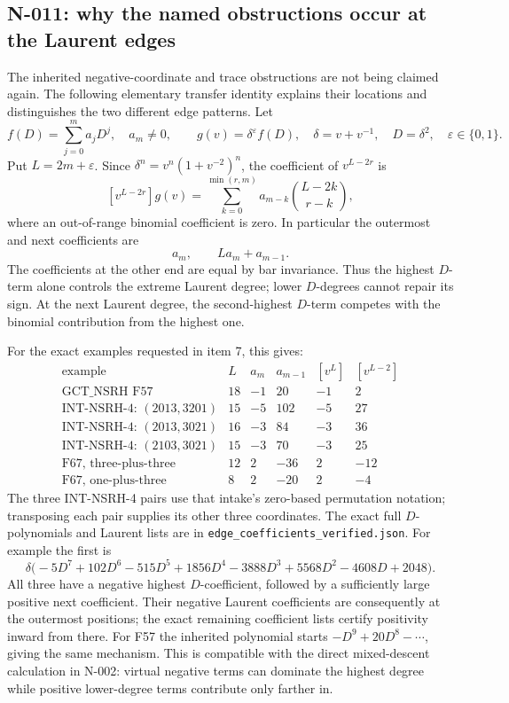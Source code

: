 \subsection{N-011: why the named obstructions occur at the Laurent edges}
\label{sec:nonstandard-edges}

The inherited negative-coordinate and trace obstructions are not being
claimed again.  The following elementary transfer identity explains
their locations and distinguishes the two different edge patterns.
Let
\[
 f(D)=\sum_{j=0}^m a_jD^j,\quad a_m\ne0,\qquad
 g(v)=\delta^\varepsilon f(D),\quad
 \delta=v+v^{-1},\quad D=\delta^2,\quad\varepsilon\in\{0,1\}.
\]
Put $L=2m+\varepsilon$.  Since
$\delta^n=v^n(1+v^{-2})^n$, the coefficient of $v^{L-2r}$ is
\[
 [v^{L-2r}]g(v)=
 \sum_{k=0}^{\min(r,m)}
 a_{m-k}\binom{L-2k}{r-k},
 \tag{N-33}
\]
where an out-of-range binomial coefficient is zero.  In particular
the outermost and next coefficients are
\[
             a_m,\qquad La_m+a_{m-1}.
 \tag{N-34}
\]
The coefficients at the other end are equal by bar invariance.
Thus the highest $D$-term alone controls the extreme Laurent degree;
lower $D$-degrees cannot repair its sign.  At the next Laurent degree,
the second-highest $D$-term competes with the binomial contribution
from the highest one.

For the exact examples requested in item 7, this gives:
\[
\begin{array}{l|r|r|r|r|r}
\text{example}&L&a_m&a_{m-1}&[v^L]&[v^{L-2}]\\\hline
\text{GCT\_NSRH F57}&18&-1&20&-1&2\\
\text{INT-NSRH-4: }(2013,3201)&15&-5&102&-5&27\\
\text{INT-NSRH-4: }(2013,3021)&16&-3&84&-3&36\\
\text{INT-NSRH-4: }(2103,3021)&15&-3&70&-3&25\\
\text{F67, three-plus-three}&12&2&-36&2&-12\\
\text{F67, one-plus-three}&8&2&-20&2&-4
\end{array}
 \tag{N-35}
\]
The three INT-NSRH-4 pairs use that intake's zero-based permutation
notation; transposing each pair supplies its other three coordinates.
The exact full $D$-polynomials and Laurent lists are in
\nolinkurl{edge_coefficients_verified.json}.  For example the first is
\[
\delta\bigl(-5D^7+102D^6-515D^5+1856D^4-3888D^3
                     +5568D^2-4608D+2048\bigr).
\]
All three have a negative highest $D$-coefficient, followed by a
sufficiently large positive next coefficient.  Their negative Laurent
coefficients are consequently at the outermost positions; the exact
remaining coefficient lists certify positivity inward from there.
For F57 the inherited polynomial starts $-D^9+20D^8-\cdots$, giving
the same mechanism.  This is compatible with the direct mixed-descent
calculation in N-002: virtual negative terms can dominate the highest
degree while positive lower-degree terms contribute only farther in.

